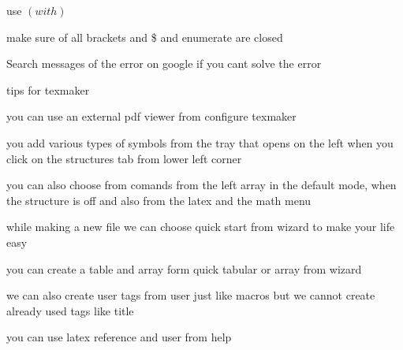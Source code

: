 \documentclass[11pt]{article}
\begin{document}
use $\left( with \right)$

make sure of all brackets and \$ and enumerate are closed

Search messages of the error on google if you cant solve the error

\vspace{1in}

tips for texmaker

you can use an external pdf viewer from configure texmaker

you add various types of symbols from the tray that opens on the left when you click on the structures tab from lower left corner 

you can also choose from comands from the left array in the default mode, when the structure is off and also from the latex and the math menu

while making a new file we can choose quick start from wizard to make your life easy

you can create a table and array form quick tabular or array from wizard

we can also create user tags from user just like macros but we cannot create already used tags like title

you can use latex reference and user from help
\end{document}

